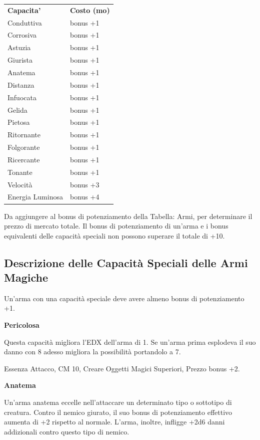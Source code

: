 \documentclass[a4paper,11pt,twoside,openany]{book}
\begin{document}
{\begin{tabular}{ll}
\toprule
\textbf{Capacita'} & \textbf{Costo (mo)}\tabularnewline
Conduttiva \index{Conduttiva}& bonus +1\tabularnewline
Corrosiva\index{Corrosiva} & bonus +1\tabularnewline
Astuzia \index{Astuzia} & bonus +1\tabularnewline
Giurista\index{Giurista} & bonus +1\tabularnewline
Anatema \index{Anatema} & bonus +1\tabularnewline
Distanza\index{Distanza} & bonus +1\tabularnewline
Infuocata\index{Infuocata} & bonus +1\tabularnewline
Gelida \index{Gelida}& bonus +1\tabularnewline
Pietosa \index{Pietosa}& bonus +1\tabularnewline
Ritornante \index{Ritornante}& bonus +1\tabularnewline
Folgorante\index{Folgorante} & bonus +1\tabularnewline
Ricercante \index{Ricercante} & bonus +1\tabularnewline
Tonante \index{Tonante}& bonus +1\tabularnewline
Velocità \index{Velocita'} & bonus +3\tabularnewline
Energia Luminosa\index{Energia Luminosa} & bonus +4\tabularnewline

\end{tabular}

\bigskip

Da aggiungere al bonus di potenziamento della Tabella: Armi, per determinare
il prezzo di mercato totale. Il bonus di potenziamento di un'arma
e i bonus equivalenti delle capacità speciali non possono superare
il totale di +10.

\subsection{Descrizione delle Capacità Speciali delle Armi Magiche}

\label{descrizione-delle-capacita-speciali-delle-armi-magiche}

Un'arma con una capacità speciale deve avere almeno bonus di potenziamento +1.

\textbf{Pericolosa}

Questa capacità migliora l'EDX dell'arma di 1. Se un'arma prima esplodeva il suo danno con 8 adesso migliora la possibilità portandolo a 7.

Essenza Attacco, CM 10, Creare Oggetti Magici Superiori, Prezzo bonus +2.

\textbf{Anatema}

Un'arma anatema eccelle nell'attaccare un determinato tipo o sottotipo di creatura. Contro il nemico giurato, il suo bonus di potenziamento effettivo aumenta di +2 rispetto al normale. L'arma, inoltre, infligge +2d6 danni addizionali contro questo tipo di nemico. 

}
\end{document}
